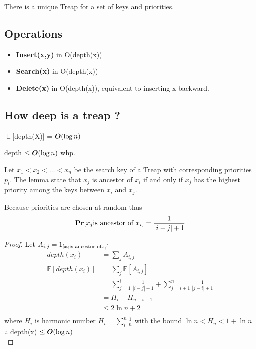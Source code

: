 \documentclass[12pt]{article}
\begin{document}
\begin{theorem}
	There is a unique Treap for a  set of keys and priorities.
\end{theorem}

\subsection{Operations}
\begin{itemize}
	\item \textbf{Insert(x,y)} in O(depth(x))
	\item \textbf{Search(x)} in O(depth(x))
	\item \textbf{Delete(x)} in O(depth(x)), equivalent to inserting x backward.
\end{itemize}


\subsection{How deep is a treap ?}
$\mathop{\mathbb{E}}$[depth(X)] = $\O(\log n)$
\begin{claim}
	depth $\leq \O(\log n)$ whp. 
\end{claim}

\begin{lemma} Let $x_1 < x_2 < \dots < x_n$ be the search key of a Treap with corresponding priorities $p_i$. The lemma state that $x_j$ is ancestor of $x_i$ if and only if $x_j$ has the highest priority among the keys between $x_i$ and $x_j$.
\end{lemma}

\begin{lemma}
	Because priorities are chosen at random thus
	$$
	\Pr[x_j \textnormal{is ancestor of } x_i] = \frac1{|i-j|+1}
	$$
\end{lemma}
\begin{proof}	Let $A_{i,j} = 1_{[ x_i\textnormal{is ancestor of} x_j]}$\\
	\begin{align*}
		depth(x_i) &= \sum_j A_{i,j} \\
		\mathbb{E}[depth(x_i)] &= \sum_j \mathbb{E}[A_{i,j}] \\
		&=\sum^i_{j=1}\frac1{|i-j|+1} + \sum_{j=i+1}^n\frac1{|j-i|+1} \\
		&=H_i +H_{n-i+1}\\
		&\leq 2 \ln n + 2\\
	\end{align*}
	where $H_i$ is harmonic number $H_i = \sum_i^n \frac1n$ with the bound $\ln n  < H_n < 1 + \ln n$\\
	$\therefore$ depth(x) $\leq \O(\log n)$\\
\end{proof}
\end{document}
